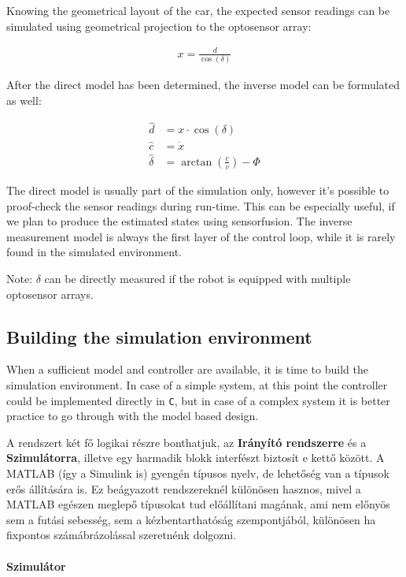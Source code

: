 Knowing the geometrical layout of the car, the expected sensor readings can be simulated using geometrical projection to the optosensor array:

\begin{align}
    x = \frac{d}{\cos(\delta)}
\end{align}

After the direct model has been determined, the inverse model can be formulated as well:

\begin{align}
    \hat{d} &= x \cdot \cos(\delta) \\
    \hat{c} &=\dot{x} \\
    \hat{\delta} &= \arctan \left(\frac{c}{v}\right) - \Phi
\end{align}

The direct model is usually part of the simulation only, however it's possible to proof-check the sensor readings during run-time. This can be especially useful, if we plan to produce the estimated states using sensorfusion. The inverse measurement model is always the first layer of the control loop, while it is rarely found in the simulated environment.

Note: $\delta$ can be directly measured if the robot is equipped with multiple optosensor arrays.

\subsection{Building the simulation environment}

When a sufficient model and controller are available, it is time to build the simulation environment. In case of a simple system, at this point the controller could be implemented directly in \verb!C!, but in case of a complex system it is better practice to go through with the model based design.



A rendszert két fő logikai részre bonthatjuk, az \textbf{Irányító rendszerre} és a \textbf{Szimulátorra}, illetve egy harmadik blokk interfészt biztosít e kettő között. A MATLAB (így a Simulink is) gyengén típusos nyelv, de lehetőség van a típusok erős állítására is. Ez beágyazott rendszereknél különösen hasznos, mivel a MATLAB egészen meglepő típusokat tud előállítani magának, ami nem előnyös sem a futási sebesség, sem a kézbentarthatóság szempontjából, különösen ha fixpontos számábrázolással szeretnénk dolgozni.

\paragraph{Szimulátor}

